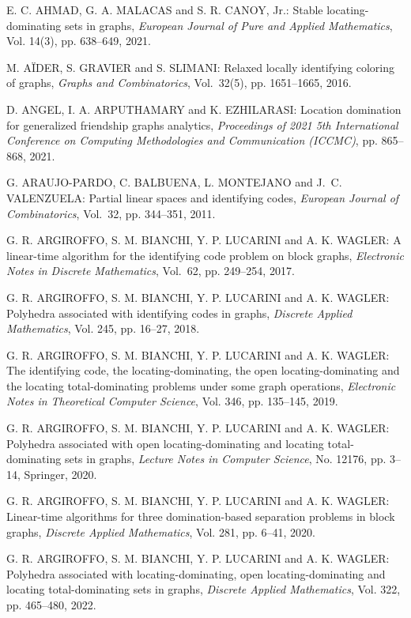 \begin{thebibliography}{999}
E. C. AHMAD, G. A. MALACAS and S. R. CANOY, Jr.: Stable locating-dominating sets in graphs, {\it European Journal of Pure and Applied Mathematics}, Vol. 14(3), pp. 638--649, 2021.

M. A\"IDER, S. GRAVIER and S. SLIMANI: Relaxed locally identifying coloring of graphs, {\it Graphs and Combinatorics}, Vol.~32(5), pp. 1651--1665, 2016.

D. ANGEL, I. A. ARPUTHAMARY and K. EZHILARASI:  Location domination for generalized friendship graphs analytics, {\it Proceedings of 2021 5th International Conference on Computing Methodologies and Communication (ICCMC)}, pp. 865--868, 2021.

G. ARAUJO-PARDO, C. BALBUENA, L. MONTEJANO and J.~C. VALENZUELA: Partial linear spaces and identifying codes, {\it European Journal of Combinatorics}, Vol.~32, pp. 344--351, 2011.

G. R. ARGIROFFO, S. M. BIANCHI, Y. P. LUCARINI and A. K. WAGLER: A linear-time algorithm for the identifying code problem on block graphs, {\it Electronic Notes in Discrete Mathematics}, Vol.~62, pp. 249--254, 2017.

G. R. ARGIROFFO, S. M. BIANCHI, Y. P. LUCARINI and A. K. WAGLER: Polyhedra associated with identifying codes in graphs, {\it Discrete Applied Mathematics}, Vol. 245, pp. 16--27, 2018.

G. R. ARGIROFFO, S. M. BIANCHI, Y. P. LUCARINI and A. K. WAGLER: The identifying code, the locating-dominating, the open locating-dominating and the locating total-dominating problems under some graph operations, {\it Electronic Notes in Theoretical Computer Science}, Vol. 346, pp. 135--145, 2019.

G. R. ARGIROFFO, S. M. BIANCHI, Y. P. LUCARINI and A. K. WAGLER: Polyhedra associated with open locating-dominating and locating total-dominating sets in graphs, {\it Lecture Notes in Computer Science}, No. 12176, pp. 3--14, Springer, 2020.

G. R. ARGIROFFO, S. M. BIANCHI, Y. P. LUCARINI and A. K. WAGLER: Linear-time algorithms for three domination-based separation problems in block graphs, {\it Discrete Applied Mathematics}, Vol. 281, pp. 6--41, 2020.

G. R. ARGIROFFO, S. M. BIANCHI, Y. P. LUCARINI and A. K. WAGLER: Polyhedra associated with locating-dominating, open locating-dominating and locating total-dominating sets in graphs, {\it Discrete Applied Mathematics}, Vol. 322, pp. 465--480, 2022.


\end{thebibliography}

